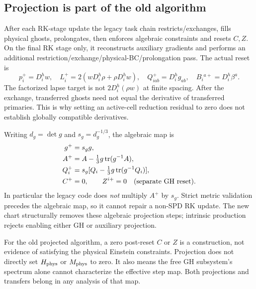 \documentclass[11pt,letterpaper]{article}
\begin{document}
\subsection{Projection is part of the old algorithm}
After each RK-stage update the legacy task chain restricts/exchanges, fills physical ghosts, prolongates, then enforces algebraic constraints and resets $C,Z$. On the final RK stage only, it reconstructs auxiliary gradients and performs an additional restriction/exchange/physical-BC/prolongation pass. The actual reset is
\begin{equation}
p_i^+=D_i^hw,\quad L_i^+=2(wD_i^h\rho+\rho D_i^hw),\quad
Q_{iab}^+=D_i^hg_{ab},\quad B_i{}^{a+}=D_i^h\beta^a.
\end{equation}
The factorized lapse target is not $2D_i^h(\rho w)$ at finite spacing. After the exchange, transferred ghosts need not equal the derivative of transferred primaries. This is why setting an active-cell reduction residual to zero does not establish globally compatible derivatives.

Writing $d_g=\det g$ and $s_g=d_g^{-1/3}$, the algebraic map is
\begin{align}
g^+&=s_g g,\\
A^+&=A-\tfrac13g\operatorname{tr}(g^{-1}A),\\
Q_i^+&=s_g[Q_i-\tfrac13g\operatorname{tr}(g^{-1}Q_i)],\\
C^+&=0,\qquad Z^{i+}=0\quad\hbox{(separate GH reset).}
\end{align}
In particular the legacy code does \emph{not} multiply $A^+$ by $s_g$. Strict metric validation precedes the algebraic map, so it cannot repair a non-SPD RK update. The new chart structurally removes these algebraic projection steps; intrinsic production rejects enabling either GH or auxiliary projection.

For the old projected algorithm, a zero post-reset $C$ or $Z$ is a construction, not evidence of satisfying the physical Einstein constraints. Projection does not directly set $H_{\rm phys}$ or $M_{\rm phys}$ to zero. It also means the free GH subsystem's spectrum alone cannot characterize the effective step map. Both projections and transfers belong in any analysis of that map.
\end{document}
